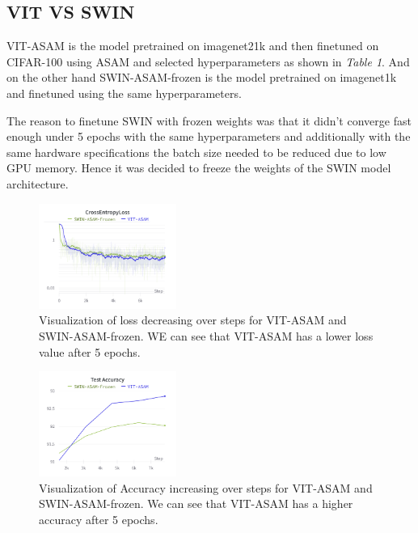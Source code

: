 \documentclass{article}
\begin{document}
\subsection{VIT VS SWIN}
VIT-ASAM is the model pretrained on imagenet21k and then finetuned on CIFAR-100 using ASAM and selected hyperparameters as shown in \textit{Table 1}.
And on the other hand SWIN-ASAM-frozen is the model pretrained on imagenet1k and finetuned using the same hyperparameters.

The reason to finetune SWIN with frozen weights was that it didn't converge fast enough under 5 epochs with the same hyperparameters and additionally with the same hardware specifications the batch size needed to be reduced due to low GPU memory.
Hence it was decided to freeze the weights of the SWIN model architecture.

\begin{figure}[ht]
    \vskip 0.2in
    \centering
    \includegraphics[width=0.4\textwidth]{cross_entropy_loss.png}
    \caption{Visualization of loss decreasing over steps for VIT-ASAM and SWIN-ASAM-frozen. WE can see that VIT-ASAM has a lower loss value after 5 epochs.}
    \label{fig:foobar}
    \vskip -0.2in
\end{figure}

\begin{figure}[ht]
    \vskip 0.2in
    \centering
    \includegraphics[width=0.4\textwidth]{test_accuracy.png}
    \caption{Visualization of Accuracy increasing over steps for VIT-ASAM and SWIN-ASAM-frozen. We can see that VIT-ASAM has a higher accuracy after 5 epochs.}
    \label{fig:foobar}
    \vskip -0.2in
\end{figure}
\end{document}
